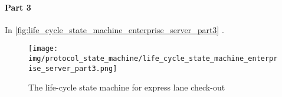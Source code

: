 \paragraph*{Part 3} In \autoref{fig:life_cycle_state_machine_enterprise_server_part3} .

\begin{figure}[H]
\centering
\texttt{[image: img/protocol\_state\_machine/life\_cycle\_state\_machine\_enterprise\_server\_part3.png]}
\caption{The life-cycle state machine for express lane check-out}
\label{fig:life_cycle_state_machine_enterprise_server_part3}
\end{figure}